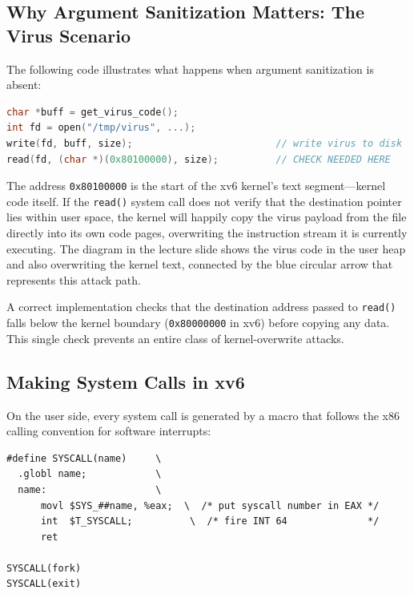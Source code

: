 \documentclass[11pt]{article}
\begin{document}
\subsection{Why Argument Sanitization Matters: The Virus Scenario}

The following code illustrates what happens when argument sanitization is absent:

\begin{lstlisting}[language=C, caption={Unsanitized system call argument enables kernel memory overwrite}]
char *buff = get_virus_code();
int fd = open("/tmp/virus", ...);
write(fd, buff, size);                         // write virus to disk
read(fd, (char *)(0x80100000), size);          // CHECK NEEDED HERE
\end{lstlisting}

The address \texttt{0x80100000} is the start of the xv6 kernel's text segment---kernel code
itself. If the \texttt{read()} system call does not verify that the destination pointer lies
within user space, the kernel will happily copy the virus payload from the file directly into
its own code pages, overwriting the instruction stream it is currently executing.
The diagram in the lecture slide shows the virus code in the user heap and also overwriting
the kernel text, connected by the blue circular arrow that represents this attack path.

A correct implementation checks that the destination address passed to \texttt{read()} falls
below the kernel boundary (\texttt{0x80000000} in xv6) before copying any data. This single
check prevents an entire class of kernel-overwrite attacks.

\subsection{Making System Calls in xv6}

On the user side, every system call is generated by a macro that follows the x86 calling
convention for software interrupts:

\begin{lstlisting}[language={[x86masm]Assembler}, caption={usys.S --- SYSCALL macro used to generate all xv6 system call stubs}]
#define SYSCALL(name)     \
  .globl name;            \
  name:                   \
      movl $SYS_##name, %eax;  \  /* put syscall number in EAX */
      int  $T_SYSCALL;          \  /* fire INT 64              */
      ret

SYSCALL(fork)
SYSCALL(exit)
\end{lstlisting}
\end{document}

